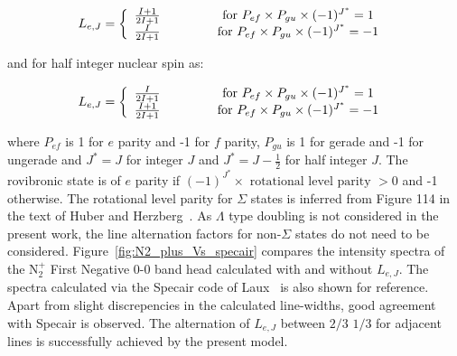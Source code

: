 \begin{equation}
 L_{e,J} = \left \lbrace \begin{array}{cc} \frac{I+1}{2I + 1} & \text{ \hspace{1cm} for $P_{ef} \times P_{gu} \times ( -1 )^{J^\ast} = 1$ } \\
                                                                        \frac{I}{2I + 1} & \text{ \hspace{1cm} for $P_{ef} \times P_{gu} \times ( -1 )^{J^\ast} = -1$ } 
                                      \end{array} \right .
\end{equation}

\noindent and for half integer nuclear spin as:

\begin{equation}
 L_{e,J} = \left \lbrace \begin{array}{cc} \frac{I}{2I + 1} & \text{ \hspace{1cm} for $P_{ef} \times P_{gu} \times ( -1 )^{J^\ast} = 1$ } \\
                                                                        \frac{I+1}{2I + 1} & \text{ \hspace{1cm} for $P_{ef} \times P_{gu} \times ( -1 )^{J^\ast} = -1$ } 
                                      \end{array} \right .
\end{equation}

\noindent where $P_{ef}$ is 1 for $e$ parity and -1 for $f$ parity, $P_{gu}$ is 1 for gerade and -1 for ungerade and $J^\ast = J$ for integer $J$ and $J^\ast = J - \frac{1}{2}$ for half integer $J$.
The rovibronic state is of $e$ parity if $(-1)^{J^\ast} \times \text{ rotational level parity } > 0$ and -1 otherwise.
The rotational level parity for $\Sigma$ states is inferred from Figure 114 in the text of Huber and Herzberg~\cite{HH_1979}.
As $\Lambda$ type doubling is not considered in the present work, the line alternation factors for non-$\Sigma$ states do not need to be considered.
Figure~\ref{fig:N2_plus_Vs_specair} compares the intensity spectra of the N$_2^+$ First Negative 0-0 band head calculated with and without $L_{e,J}$.
The spectra calculated via the Specair code of Laux~\cite{laux_2002,laux_2003} is also shown for reference.
Apart from slight discrepencies in the calculated line-widths, good agreement with Specair is observed.
The alternation of $L_{e,J}$ between $2/3$ $1/3$ for adjacent lines is successfully achieved by the present model.

